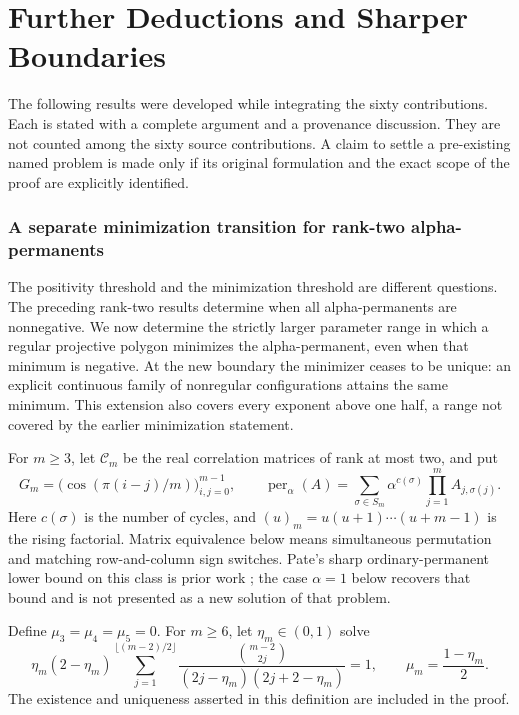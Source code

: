 \documentclass[11pt,a4paper]{article}
\theoremstyle{definition}\newtheorem{definition}[theorem]{Definition}
\theoremstyle{remark}\newtheorem{remark}[theorem]{Remark}
\numberwithin{equation}{section}
\begin{document}
\clearpage\part{Further Deductions and Sharper Boundaries}

\noindent The following results were developed while integrating the sixty contributions. Each is stated with a complete argument and a provenance discussion. They are not counted among the sixty source contributions. A claim to settle a pre-existing named problem is made only if its original formulation and the exact scope of the proof are explicitly identified.


\clearpage
{}
\section{A separate minimization transition for rank-two alpha-permanents}
\label{ext-showa-section}

The positivity threshold and the minimization threshold are different questions.
The preceding rank-two results determine when all alpha-permanents are
nonnegative. We now determine the strictly larger parameter range in which a
regular projective polygon minimizes the alpha-permanent, even when that
minimum is negative. At the new boundary the minimizer ceases to be unique:
an explicit continuous family of nonregular configurations attains the same
minimum. This extension also covers every exponent above one half, a range
not covered by the earlier minimization statement.

For $m\ge3$, let $\mathcal C_m$ be the real correlation matrices of rank at
most two, and put
\[
 G_m=\bigl(\cos(\pi(i-j)/m)\bigr)_{i,j=0}^{m-1},\qquad
 \operatorname{per}_{\alpha}(A)=
 \sum_{\sigma\in S_m}\alpha^{c(\sigma)}\prod_{j=1}^m A_{j,\sigma(j)}.
\]
Here $c(\sigma)$ is the number of cycles, and $(u)_m=u(u+1)\cdots(u+m-1)$
is the rising factorial. Matrix equivalence below means
simultaneous permutation and matching row-and-column sign switches.
Pate's sharp ordinary-permanent lower bound on this class is prior work
\cite{ext-showa-Pate}; the case $\alpha=1$ below recovers that bound and is
not presented as a new solution of that problem.

Define $\mu_3=\mu_4=\mu_5=0$. For $m\ge6$, let $\eta_m\in(0,1)$ solve
\begin{equation}\label{ext-showa-minroot}
 \eta_m(2-\eta_m)
 \sum_{j=1}^{\lfloor(m-2)/2\rfloor}
 \frac{\binom{m-2}{2j}}{(2j-\eta_m)(2j+2-\eta_m)}=1,
 \qquad \mu_m=\frac{1-\eta_m}{2}.
\end{equation}
The existence and uniqueness asserted in this definition are included in
the proof.
\end{document}
